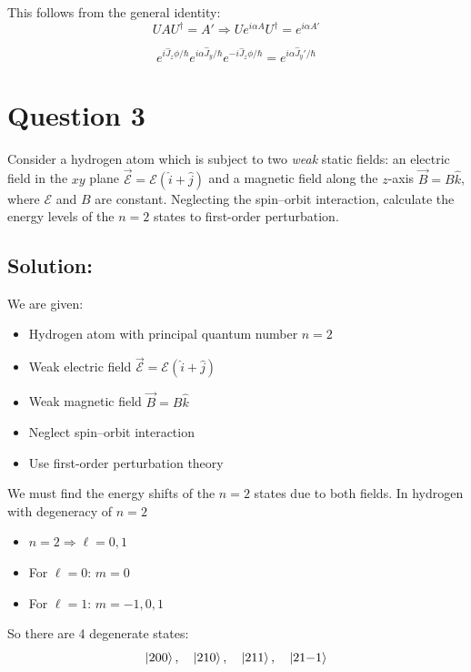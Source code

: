 \documentclass[12pt]{article}
\begin{document}
        This follows from the general identity:
        \[
            U A U^\dagger = A' \Rightarrow U e^{i \alpha A} U^\dagger = e^{i \alpha A'}
        \]
        
        \[
        \boxed{
            e^{i \hat{J}_z \phi / \hbar} e^{i \alpha \hat{J}_y / \hbar} e^{-i \hat{J}_z \phi / \hbar} = e^{i \alpha \hat{J}_y' / \hbar}        }
        \]

\section{Question 3}
    Consider a hydrogen atom which is subject to two \textit{weak} static fields: an electric field in the \( xy \) plane \( \vec{\mathcal{E}} = \mathcal{E}(\hat{i} + \hat{j}) \) and a magnetic field along the \( z \)-axis \( \vec{B} = B \hat{k} \), where \( \mathcal{E} \) and \( B \) are constant. Neglecting the spin–orbit interaction, calculate the energy levels of the \( n = 2 \) states to first-order perturbation.

    \subsection{Solution:}
        We are given:
        \begin{itemize}
            \item Hydrogen atom with principal quantum number \( n = 2 \)
            \item Weak electric field \( \vec{\mathcal{E}} = \mathcal{E}(\hat{i} + \hat{j}) \)
            \item Weak magnetic field \( \vec{B} = B \hat{k} \)
            \item Neglect spin–orbit interaction
            \item Use first-order perturbation theory
        \end{itemize}
        
        We must find the energy shifts of the \( n = 2 \) states due to both fields. In hydrogen with degeneracy of \( n = 2 \)
        \begin{itemize}
            \item \( n = 2 \Rightarrow \ell = 0, 1 \)
            \item For \( \ell = 0 \): \( m = 0 \)
            \item For \( \ell = 1 \): \( m = -1, 0, 1 \)
        \end{itemize}
        
        So there are 4 degenerate states:
        \[
            \ket{200}, \quad \ket{210}, \quad \ket{211}, \quad \ket{21{-1}}
        \]
        
\end{document}
